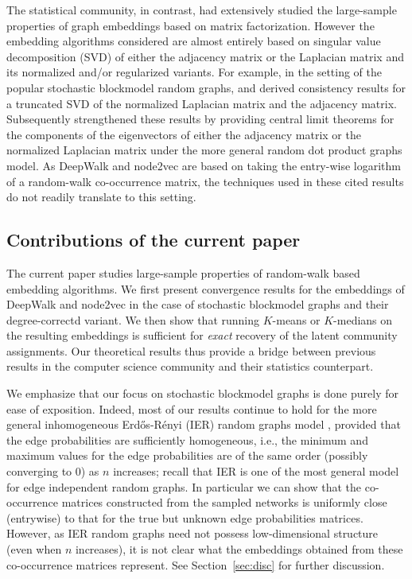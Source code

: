\documentclass[10pt,journal,compsoc]{IEEEtran}
\numberwithin{equation}{section}
\begin{document}
The statistical community, in contrast, had extensively studied the
large-sample properties of graph embeddings
based on matrix factorization. However the embedding algorithms
considered are almost entirely based on singular value decomposition (SVD) of either the
adjacency matrix or the Laplacian matrix and its normalized and/or
regularized variants. For example, in the setting of the popular
stochastic blockmodel random graphs, \cite{rohe2011spectral} and
\cite{sussman2012consistent} derived consistency results for a
truncated SVD of the normalized Laplacian
matrix and the adjacency matrix. %
Subsequently 
\cite{tang2018limit,grdpg} strengthened these results by providing
central limit theorems for the components of the eigenvectors of
either the adjacency matrix or the normalized Laplacian matrix under
the more general random dot product graphs model. As DeepWalk and node2vec are based on taking the entry-wise
logarithm of a random-walk co-occurrence matrix, the techniques used in these cited results do not readily translate to this setting.

\subsection{Contributions of the current paper} The current paper
studies large-sample properties of random-walk based
embedding algorithms. We first present convergence results for
the embeddings of DeepWalk and node2vec in the case of stochastic
blockmodel graphs and their degree-correctd variant. We then show that running $K$-means or $K$-medians on the resulting
embeddings is sufficient for {\em exact} recovery of the latent community
assignments.  Our theoretical results thus provide a bridge between
previous results in the computer science community and
their statistics counterpart.

We emphasize that our focus on stochastic blockmodel graphs 
is done purely for ease of exposition. Indeed, most of our results continue to hold for the
more general inhomogeneous Erd\H{o}s-R\'{e}nyi (IER) random graphs
model \cite{bollobas2001random,hoff2002}, provided that the edge probabilities are sufficiently
homogeneous, i.e., the minimum and maximum values for the edge
probabilities are of the same order (possibly converging to $0$) as $n$
increases; recall that IER is one of the most general model for
edge independent random graphs. In particular we can show that the co-occurrence matrices constructed from the sampled networks is uniformly close (entrywise) to that for the true but unknown edge probabilities matrices. However, as IER random graphs need not possess low-dimensional structure (even when $n$ increases), it is not clear what the embeddings obtained from these co-occurrence matrices represent. See Section~\ref{sec:disc} for further
discussion. 
\end{document}
